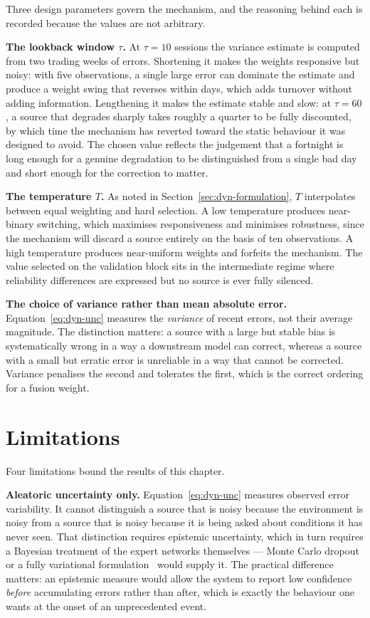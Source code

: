 Three design parameters govern the mechanism, and the reasoning behind each is recorded because
the values are not arbitrary.

\textbf{The lookback window $\tau$.} At $\tau = 10$ sessions the variance estimate is computed
from two trading weeks of errors. Shortening it makes the weights responsive but noisy: with five
observations, a single large error can dominate the estimate and produce a weight swing that
reverses within days, which adds turnover without adding information. Lengthening it makes the
estimate stable and slow: at $\tau = 60$, a source that degrades sharply takes roughly a quarter
to be fully discounted, by which time the mechanism has reverted toward the static behaviour it
was designed to avoid. The chosen value reflects the judgement that a fortnight is long enough
for a genuine degradation to be distinguished from a single bad day and short enough for the
correction to matter.

\textbf{The temperature $T$.} As noted in Section~\ref{sec:dyn-formulation}, $T$ interpolates
between equal weighting and hard selection. A low temperature produces near-binary switching,
which maximises responsiveness and minimises robustness, since the mechanism will discard a
source entirely on the basis of ten observations. A high temperature produces near-uniform
weights and forfeits the mechanism. The value selected on the validation block sits in the
intermediate regime where reliability differences are expressed but no source is ever fully
silenced.

\textbf{The choice of variance rather than mean absolute error.} Equation~\eqref{eq:dyn-unc}
measures the \emph{variance} of recent errors, not their average magnitude. The distinction
matters: a source with a large but stable bias is systematically wrong in a way a downstream model
can correct, whereas a source with a small but erratic error is unreliable in a way that cannot be
corrected. Variance penalises the second and tolerates the first, which is the correct ordering
for a fusion weight.

\section{Limitations}
\label{sec:dyn-limits}

Four limitations bound the results of this chapter.

\textbf{Aleatoric uncertainty only.} Equation~\eqref{eq:dyn-unc} measures observed error
variability. It cannot distinguish a source that is noisy because the environment is noisy from a
source that is noisy because it is being asked about conditions it has never seen. That
distinction requires epistemic uncertainty, which in turn requires a Bayesian treatment of the
expert networks themselves --- Monte Carlo dropout~\cite{gal2016dropout} or a fully variational
formulation~\cite{kendall2017} would supply it. The practical difference matters: an epistemic
measure would allow the system to report low confidence \emph{before} accumulating errors rather
than after, which is exactly the behaviour one wants at the onset of an unprecedented event.

